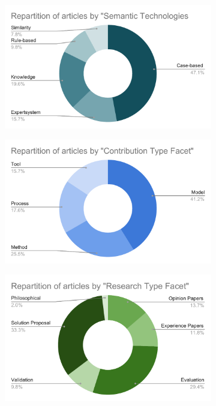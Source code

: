             \begin{figure}[h]
                \centering
                \begin{subfigure}[b]{0.45\textwidth}
                    \centering
                    \includegraphics[width=\textwidth]{images/Repartition_by_Semantic_Technologies_usage.pdf}
                \end{subfigure}
                \begin{subfigure}[b]{0.45\textwidth}
                    \centering
                    \includegraphics[width=\textwidth]{images/Repartition_by_Contribution_Type_Facet.pdf}
                \end{subfigure}
                \begin{subfigure}[b]{0.45\textwidth}
                    \centering
                    \includegraphics[width=\textwidth]{images/Repartition_by _Research_Type_Facet.pdf}

\end{subfigure}
\end{figure}
